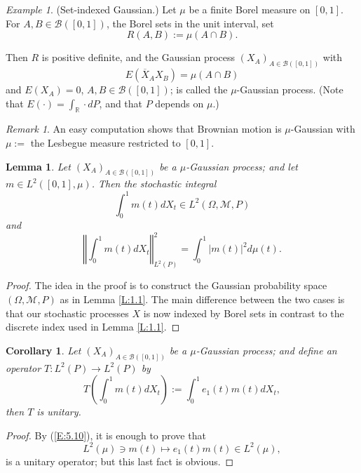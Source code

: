 \documentclass{birkmult}
\newtheorem{cor}[thm]{Corollary}
\newtheorem{lem}[thm]{Lemma}
\theoremstyle{definition}
\theoremstyle{remark}
\newtheorem{rem}[thm]{Remark}
\newtheorem*{ex}{Example}
\numberwithin{equation}{section}
\begin{document}
\begin{ex}
\label{ex:5.3}
(Set-indexed Gaussian.) Let $\mu$ be a finite Borel measure on $[0,1]$. 
For $A, B \in \mathcal{B}([0,1])$, the Borel sets in the unit interval, set 
\begin{equation}
\label{E:5.7}
  R(A,B):= \mu(A \cap B).
\end{equation}

Then $R$ is positive definite, and the Gaussian process 
$(X_{A})_{A \in \mathcal{B}([0,1])}$ with
\begin{equation}
\label{E:5.8}
  E(\overline{X}_{A}X_{B}) = \mu(A \cap B)
\end{equation}
and $E(X_{A}) = 0$, $A, B \in \mathcal{B}([0,1])$; is called the 
$\mu$-Gaussian process.  (Note that $E(\cdot)=\int_{\mathbb{R}}\cdot dP$, 
and that $P$ depends on $\mu$.)
\end{ex}

\begin{rem}
\label{R:5.4}
An easy computation shows that Brownian motion is $\mu$-Gaussian with 
$\mu :=$ the Lesbegue measure restricted to $[0,1]$.
\end{rem}

\begin{lem}
\label{L:5.5}
\cite{Nel69} Let $(X_{A})_{A \in \mathcal{B}([0,1])}$ be a $\mu$-Gaussian 
process; and let $m \in L^{2}([0,1], \mu)$.  Then the stochastic integral 
\begin{equation}
\label{E:5.9}
  \int_{0}^{1}m(t)dX_{t} \in L^{2}(\Omega, \mathcal{M}, P) 
\end{equation}
and
\begin{equation}
\label{E:5.10}
  \left\Vert\int_{0}^{1}m(t)dX_{t}\right\Vert^{2}_{L^{2}(P)} = \int_{0}^{1}|m(t)|^{2}d\mu(t). 
\end{equation}
\end{lem}
\begin{proof}
The idea in the proof is to construct the Gaussian probability space 
$(\Omega, \mathcal{M}, P)$ as in Lemma \ref{L:1.1}.  The main difference 
between the two cases is that our stochastic processes $X$ is now indexed 
by Borel sets in contrast to the discrete index used in Lemma \ref{L:1.1}.
\end{proof}

\begin{cor}
\label{C:5.6}
Let $(X_{A})_{A \in \mathcal{B}([0,1])}$ be a $\mu$-Gaussian process; and 
define an operator $T:L^{2}(P) \to L^{2}(P)$ by 
\begin{equation}
\label{E:5.11}
  T(\int_{0}^{1}m(t)dX_{t}) := \int_{0}^{1}e_{1}(t)m(t)dX_{t},
\end{equation}
then $T$ is unitary.
\end{cor}
\begin{proof}
By (\ref{E:5.10}), it is enough to prove that 
\begin{equation}
\label{E:5.12}
  L^{2}(\mu) \ni m(t) \mapsto e_{1}(t)m(t) \in L^{2}(\mu),
\end{equation}
is a unitary operator; but this last fact is obvious.
\end{proof}
\end{document}
